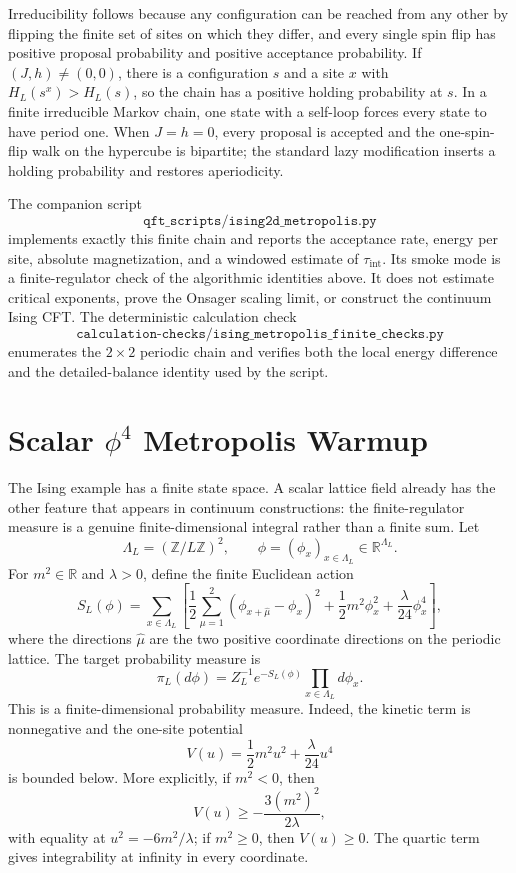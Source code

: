 Irreducibility follows because any configuration can be reached from any
other by flipping the finite set of sites on which they differ, and every
single spin flip has positive proposal probability and positive acceptance
probability.  If \((J,h)\neq(0,0)\), there is a configuration \(s\) and a site
\(x\) with \(H_L(s^x)>H_L(s)\), so the chain has a positive holding
probability at \(s\).  In a finite irreducible Markov chain, one state with a
self-loop forces every state to have period one.  When \(J=h=0\), every
proposal is accepted and the one-spin-flip walk on the hypercube is bipartite;
the standard lazy modification inserts a holding probability and restores
aperiodicity.

The companion script
\[
  \texttt{qft\_scripts/ising2d\_metropolis.py}
\]
implements exactly this finite chain and reports the acceptance rate, energy
per site, absolute magnetization, and a windowed estimate of
\(\tau_{\mathrm{int}}\).  Its smoke mode is a finite-regulator check of the
algorithmic identities above.  It does not estimate critical exponents, prove
the Onsager scaling limit, or construct the continuum Ising CFT.
The deterministic calculation check
\[
  \texttt{calculation-checks/ising\_metropolis\_finite\_checks.py}
\]
enumerates the \(2\times2\) periodic chain and verifies both the local energy
difference and the detailed-balance identity used by the script.

\section{\texorpdfstring{Scalar \(\phi^4\) Metropolis Warmup}{Scalar phi4 Metropolis Warmup}}

The Ising example has a finite state space.  A scalar lattice field already
has the other feature that appears in continuum constructions: the
finite-regulator measure is a genuine finite-dimensional integral rather than
a finite sum.  Let
\[
  \Lambda_L=(\mathbb Z/L\mathbb Z)^2,\qquad
  \phi=(\phi_x)_{x\in\Lambda_L}\in\mathbb R^{\Lambda_L}.
\]
For \(m^2\in\mathbb R\) and \(\lambda>0\), define the finite Euclidean action
\begin{equation}
  S_L(\phi)
  =
  \sum_{x\in\Lambda_L}
  \left[
    \frac12\sum_{\mu=1}^2(\phi_{x+\hat\mu}-\phi_x)^2
    +\frac12m^2\phi_x^2+\frac{\lambda}{24}\phi_x^4
  \right],
  \label{eq:phi4-two-dimensional-finite-lattice-action}
\end{equation}
where the directions \(\hat\mu\) are the two positive coordinate directions
on the periodic lattice.  The target probability measure is
\[
  \pi_L(d\phi)
  =
  Z_L^{-1}e^{-S_L(\phi)}\prod_{x\in\Lambda_L}d\phi_x .
\]
This is a finite-dimensional probability measure.  Indeed, the kinetic term
is nonnegative and the one-site potential
\[
  V(u)=\frac12m^2u^2+\frac{\lambda}{24}u^4
\]
is bounded below.  More explicitly, if \(m^2<0\), then
\[
  V(u)\geq -\frac{3(m^2)^2}{2\lambda},
\]
with equality at \(u^2=-6m^2/\lambda\); if \(m^2\geq0\), then \(V(u)\geq0\).
The quartic term gives integrability at infinity in every coordinate.

